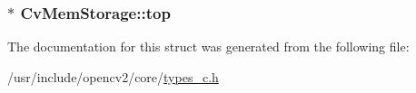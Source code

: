 \hypertarget{structCvMemStorage_ae68336bd5602675740211f0320fe992b}{
\subsubsection[{top}]{$\ast$ Cv\-Mem\-Storage\-::top}}\label{structCvMemStorage_ae68336bd5602675740211f0320fe992b}


The documentation for this struct was generated from the following file\-:\begin{DoxyCompactItemize}
\item 
/usr/include/opencv2/core/\hyperlink{core_2types__c_8h}{types\-\_\-c.\-h}\end{DoxyCompactItemize}
